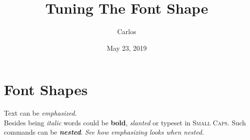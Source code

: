 \documentclass[a4paper,11pt]{article}
\begin{document}
\title{Tuning The Font Shape}
\author{Carlos}
\date{May 23, 2019}
\maketitle

\section{Font Shapes}
Text can be \emph{emphasized}.
\\
Besides being \textit{italic} words could be \textbf{bold},
\textsl{slanted} or typeset in \textsc{Small Caps}.
Such commands can be \textit{\textbf{nested}}.
\emph{See how \emph{emphasizing} looks when nested.}
\end{document}
